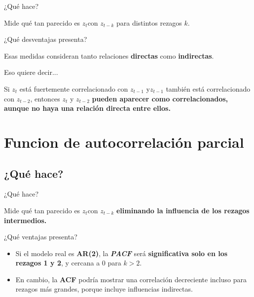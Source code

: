 \documentclass[11pt]{beamer}
\begin{document}
\begin{frame}{¿Qué hace?}
\begin{block}{}
	Mide qué tan parecido es $z_t$​ con $z_{t - k}$ para distintos rezagos $k$.
\end{block}
\end{frame}

\begin{frame}{¿Qué desventajas presenta?}
\begin{block}{}
	Esas medidas consideran tanto relaciones \textbf{directas} como \textbf{indirectas}.
\end{block}
\end{frame}

\begin{frame}{Eso quiere decir...}
\begin{block}{}
Si $z_t$ está fuertemente correlacionado con $z_{t-1}$ y​ $z_{t-1}$ también está correlacionado con $z_{t-2}$, entonces $z_t$ y $z_{t-2}$ \textbf{pueden aparecer como correlacionados, aunque no haya una relación directa entre ellos.}
\end{block}
\end{frame}


\section{Funcion de autocorrelación parcial}
\begin{frame} 
\tableofcontents[currentsection] %
\end{frame}
\subsection{¿Qué hace?}
\begin{frame}{¿Qué hace?}
\begin{block}{}
	Mide qué tan parecido es $z_t$​ con $z_{t - k}$ \textbf{eliminando la influencia de los rezagos intermedios.}
\end{block}
\end{frame}

\begin{frame}{¿Qué ventajas presenta?}
\begin{block}{}
\begin{itemize}
	\item Si el modelo real es \textbf{AR(2)}, la \textbf{\textit{PACF}} será \textbf{significativa solo en los rezagos 1 y 2}, y cercana a 0 para $k>2$.
	\item En cambio, la \textbf{ACF} podría mostrar una correlación decreciente incluso para rezagos más grandes, porque incluye influencias indirectas.
\end{itemize}
\end{block}
\end{frame}
\end{document}
